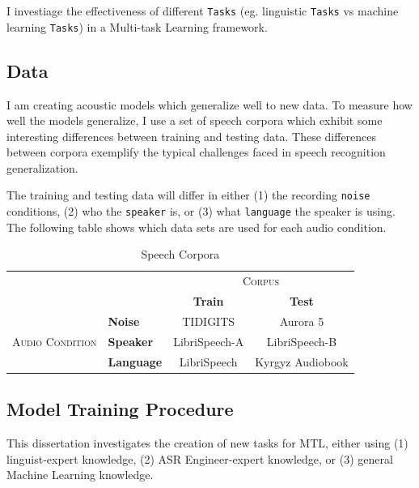 \documentclass[10pt,a4paper]{article}
\begin{document}
I investiage the effectiveness of different \texttt{Tasks} (eg. linguistic \texttt{Tasks} vs machine learning \texttt{Tasks}) in a Multi-task Learning framework.


\subsection{Data}

I am creating acoustic models which generalize well to new data. To measure how well the models generalize, I use a set of speech corpora which exhibit some interesting differences between training and testing data. These differences between corpora exemplify the typical challenges faced in speech recognition generalization.

The training and testing data will differ in either (1) the recording \texttt{noise} conditions, (2) who the \texttt{speaker} is, or (3) what \texttt{language} the speaker is using. The following table shows which data sets are used for each audio condition.


\begin{table}[!htbp]
  \centering
  \begin{adjustbox}{width=.75\textwidth}
    \begin{tabular}{clcc}
      \toprule
      && \multicolumn{2}{c}{\textsc{Corpus}}\\
      && \textbf{Train} & \textbf{Test}\\
      \midrule
      \multirow{3}{*}{\textsc{Audio Condition}} &\textbf{Noise} & TIDIGITS & Aurora 5 \\
      &\textbf{Speaker} & LibriSpeech-A & LibriSpeech-B \\
      &\textbf{Language} & LibriSpeech & Kyrgyz Audiobook \\
      \bottomrule
    \end{tabular}
    \label{table:data}
  \end{adjustbox}
  
  \caption{Speech Corpora}
  
\end{table}


\subsection{Model Training Procedure}

This dissertation investigates the creation of new tasks for MTL, either using (1) linguist-expert knowledge, (2) ASR Engineer-expert knowledge, or (3) general Machine Learning knowledge.
\end{document}
